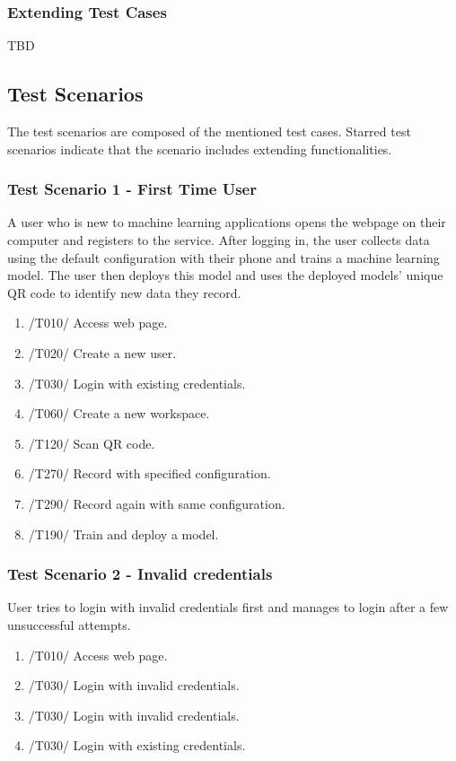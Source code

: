 \subsubsection{Extending Test Cases}
TBD
\subsection{Test Scenarios}
The test scenarios are composed of the mentioned test cases. Starred test scenarios indicate that the scenario includes extending functionalities.
\subsubsection{Test Scenario 1 - First Time User}
A user who is new to machine learning applications opens the webpage on their computer and registers to the service. After logging in, the user collects data using the default configuration with their phone and trains a machine learning model. The user then deploys this model and uses the deployed models' unique QR code to identify new data they record. 
\newpage
\begin{enumerate}
    \item /T010/ Access web page.
    \item /T020/ Create a new user.
    \item /T030/ Login with existing credentials.
    \item /T060/ Create a new workspace.
    \item /T120/ Scan QR code.
    \item /T270/ Record with specified configuration.
    \item /T290/ Record again with same configuration.
    \item /T190/ Train and deploy a model.
\end{enumerate}
\subsubsection{Test Scenario 2 - Invalid credentials}
User tries to login with invalid credentials first and manages to login after a few unsuccessful attempts.
\begin{enumerate}
    \item /T010/ Access web page.
    \item /T030/ Login with invalid credentials.
    \item /T030/ Login with invalid credentials.
    \item /T030/ Login with existing credentials.
\end{enumerate}
